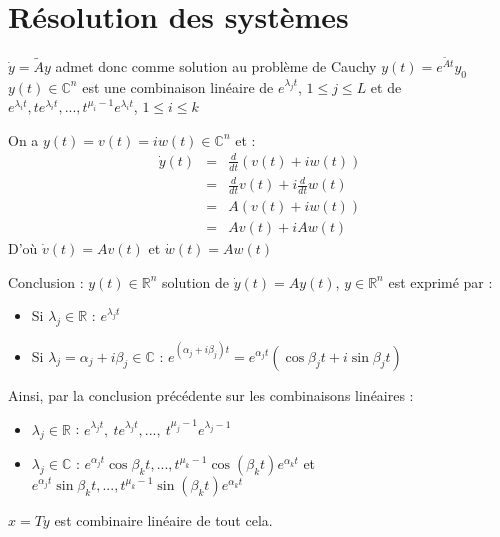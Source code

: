 \section{Résolution des systèmes}

\bigskip
$\dot{y}=\tilde{A}y$ admet donc comme solution au problème de Cauchy $y(t)=e^{\tilde{A}t}y_0$\\
$y(t)\in\mathbb{C}^n$ est une combinaison linéaire de $e^{\lambda_j t}$, $1\leq j\leq L$ et de $e^{\lambda_i t},te^{\lambda_i t},...,t^{\mu_i-1}e^{\lambda_i t}$, $1\leq i\leq k$

\begin{dem}
	On a $y(t)=v(t)=iw(t)\in\mathbb{C}^n$ et :
	\begin{eqnarray*}
		\dot{y}(t)&=&\frac{d}{dt}(v(t)+iw(t))\\
			&=&\frac{d}{dt}v(t) + i\frac{d}{dt}w(t)\\
			&=&A(v(t)+iw(t))\\
			&=&Av(t) + iAw(t)
	\end{eqnarray*}
	D'où $\dot{v}(t)=Av(t)$ et $\dot{w}(t)=Aw(t)$
\end{dem}

Conclusion : $y(t)\in\mathbb{R}^n$ solution de $\dot{y}(t)=Ay(t)$, $y\in\mathbb{R}^n$ est exprimé par :
\begin{itemize}
	\item Si $\lambda_j\in\mathbb{R}$ : $e^{\lambda_j t}$
	\item Si $\lambda_j=\alpha_j+i\beta_j\in\mathbb{C}$ : $e^{(\alpha_j+i\beta_j)t}=e^{\alpha_j t}(\cos \beta_j t + i\sin \beta_j t)$
\end{itemize}

\bigskip
Ainsi, par la conclusion précédente sur les combinaisons linéaires :
\begin{itemize} 
	\item $\lambda_j\in\mathbb{R}$ : $e^{\lambda_j t},\ te^{\lambda_j t},...,\ t^{\mu_j-1}e^{\lambda_j-1}$
	\item $\lambda_j\in\mathbb{C}$ : $e^{\alpha_j t}\cos \beta_k t,...,t^{\mu_k-1}\cos(\beta_kt) e^{\alpha_k t}$ et $e^{\alpha_j t}\sin \beta_k t,...,t^{\mu_k-1}\sin(\beta_kt) e^{\alpha_k t}$
\end{itemize}
$x=Ty$ est combinaire linéaire de tout cela.


